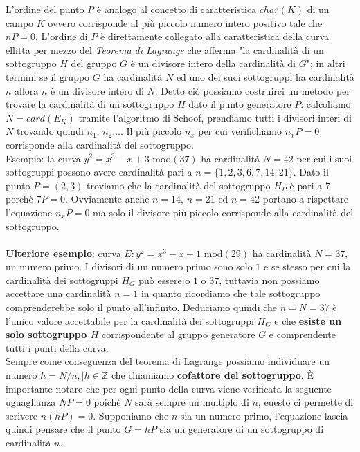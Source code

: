 \documentclass[a4paper,12pt]{tesiinfo}
\begin{document}
L'ordine del punto $P$ \`e analogo al concetto di caratteristica $char(K)$ di un campo $K$ ovvero corrisponde al pi\`u piccolo numero intero positivo tale che $nP = 0$. L'ordine di $P$ \`e direttamente collegato alla caratteristica della curva ellitta per mezzo del \textit{Teorema di Lagrange} che afferma "la cardinalit\`a di un sottogruppo $H$ del gruppo $G$ \`e un divisore intero della cardinalit\`a di $G$"; in altri termini se il gruppo $G$ ha cardinalit\`a $N$ ed uno dei suoi sottogruppi ha cardinalit\`a $n$ allora $n$ \`e un divisore intero di $N$. Detto ci\`o possiamo costruirci un metodo per trovare la cardinalit\`a di un sottogruppo $H$ dato il punto generatore $P$: calcoliamo $N = card(E_K)$ tramite l'algoritmo di Schoof, prendiamo tutti i divisori interi di $N$ trovando quindi $n_1$, $n_2 \ldots$. Il pi\`u piccolo $n_x$ per cui verifichiamo $n_xP = 0$ corrisponde alla cardinalit\`a del sottogruppo.
\\
Esempio: la curva $y^2 = x^3-x+3$ mod$(37)$ ha cardinalit\`a $N=42$ per cui i suoi sottogruppi possono avere cardinalit\`a pari a $n= \{1, 2, 3, 6, 7, 14, 21\}$. Dato il punto $P=(2, 3)$ troviamo che la cardinalit\`a del sottogruppo $H_P$ \`e pari a 7 perch\`e $7P = 0$. Ovviamente anche $n = 14$, $n = 21$ ed $n=42$ portano a rispettare l'equazione $n_xP=0$ ma solo il divisore pi\`u piccolo corrisponde alla cardinalit\`a del sottogruppo.
\\
\\
\textbf{Ulteriore esempio}: curva $E: y^2 = x^3 -x+1$ mod$(29)$ ha cardinalit\`a $N=37$, un numero primo. I divisori di un numero primo sono solo $1$ e se stesso per cui la cardinalit\`a dei sottogruppi $H_G$ pu\`o essere o $1$ o $37$, tuttavia non possiamo accettare una cardinalit\`a $n=1$ in quanto ricordiamo che tale sottogruppo comprenderebbe solo il punto all'infinito. Deduciamo quindi che $n = N = 37$ \`e l'unico valore accettabile per la cardinalit\`a dei sottogruppi $H_G$ e che \textbf{esiste un solo sottogruppo $H$} corrispondente al gruppo generatore $G$ e comprendente tutti i punti della curva.
\\
Sempre come conseguenza del teorema di Lagrange possiamo individuare un numero $h= N \big / n, \mid h \in \mathbb{Z}$ che chiamiamo \textbf{cofattore del sottogruppo}. \`E importante notare che per ogni punto della curva viene verificata la seguente uguaglianza $NP=0$ poich\`e $N$ sar\`a sempre un multiplo di $n$, euesto ci permette di scrivere $n(hP)=0$. Supponiamo che $n$ sia un numero primo, l'equazione lascia quindi pensare che il punto $G = hP$ sia un generatore di un sottogruppo di cardinalit\`a $n$.
\end{document}
